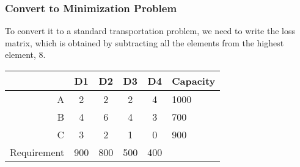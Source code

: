 \documentclass{beamer}
\begin{document}
\begin{frame}
  \frametitle{Convert to Minimization Problem}
  To convert it to a standard transportation problem, we need to write the loss matrix, which is obtained by subtracting all the elements from the highest element, 8.
    \begin{center}
  \begin{tabular}{|r|cccc|l|}
\hline
            & D1    & D2    & D3    & D4  & Capacity \\
\hline
    A       & 2     & 2     & 2     & 4   & 1000     \\ 
    B       & 4     & 6     & 4     & 3   & 700      \\
    C       & 3     & 2     & 1     & 0   & 900      \\
\hline
Requirement & 900   & 800   & 500   & 400 & \\
\hline
  \end{tabular}
\end{center}
\end{frame}
\end{document}
